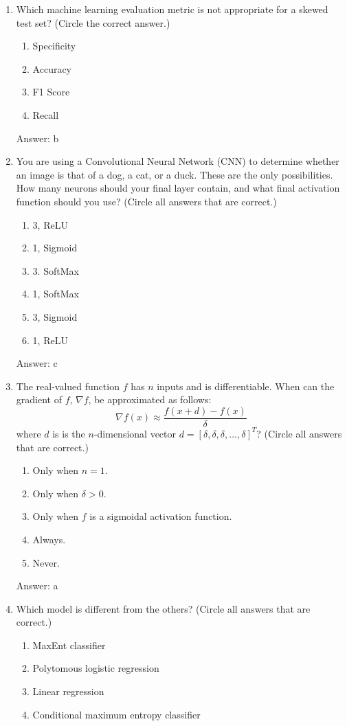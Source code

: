 \documentclass[11pt]{report}
\begin{document}
\begin{enumerate}
\item
Which machine learning evaluation metric is not appropriate for a skewed test set? (Circle the correct answer.)
\begin{enumerate}
\item Specificity
\item Accuracy
\item F1 Score
\item Recall
\end{enumerate}
\begin{mdframed}
Answer: b
\end{mdframed}
\item
You are using a Convolutional Neural Network (CNN) to determine whether an image is that of a dog, a cat, or a duck.  These are the only possibilities. How many neurons should your final layer contain, and what final activation function should you use? (Circle all answers that are correct.)
\begin{enumerate}
\item 3, ReLU
\item 1, Sigmoid
\item 3. SoftMax
\item 1, SoftMax
\item 3, Sigmoid
\item 1, ReLU
\end{enumerate}
\begin{mdframed}
Answer: c
\end{mdframed}
\item
The real-valued function $f$ has $n$ inputs and is differentiable. When can the gradient of $f$, $\nabla f$, be approximated as follows:
$$ \nabla f(x) \approx \frac{f(x+d)-f(x)}{\delta}$$ 
where $d$ is  is the $n$-dimensional vector $d = [ \delta, \delta, \delta,...,\delta]^T$? (Circle all answers that are correct.)
\begin{enumerate}
\item Only when $n=1$.
\item Only when $\delta > 0$.
\item Only when $f$ is a sigmoidal activation function.
\item Always.
\item Never.
\end{enumerate}
\begin{mdframed}
Answer: a
\end{mdframed}
\item
Which model is different from the others? (Circle all answers that are correct.)
\begin{enumerate}
\item MaxEnt classifier
\item Polytomous logistic regression
\item Linear regression 
\item Conditional maximum entropy classifier
\end{enumerate}


\end{enumerate}
\end{document}
